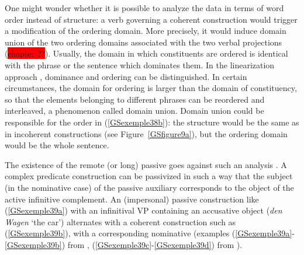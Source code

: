 \documentclass[output=paper
	        ,collection
	        ,collectionchapter
 	        ,biblatex
                ,babelshorthands
                ,newtxmath
                ,draftmode
                ,colorlinks, citecolor=brown
]{langscibook}
\begin{document}
{One might wonder whether it is possible to analyze the data in terms of word order instead of structure: a verb governing a coherent construction would trigger a modification of the ordering domain. More precisely, it would induce domain union of the two ordering domains associated with the two verbal projections (\colorbox{red}{chapter ??}). Usually, the domain in which constituents are ordered is identical with the phrase or the sentence which dominates them. In the linearization approach \citep{Reape94a}, dominance and ordering can be distinguished. In certain circumstances, the domain for ordering is larger than the domain of constituency, so that the elements belonging to different phrases can be reordered and interleaved, a phenomenon called domain union. Domain union could be responsible for the order in (\ref{GSexemple38b}): the structure would be the same as in incoherent constructions (see Figure~\ref{GSfigure9a}), but the ordering domain would be the whole sentence.

The existence of the remote (or long) passive goes against such an analysis \citep{HN94a, Kathol98b, Mueller2002b}. A complex predicate construction can be passivized in such a way that the subject (in the nominative case) of the passive auxiliary corresponds to the object of the active infinitive complement. An (impersonal) passive construction like (\ref{GSexemple39a}) with an infinitival VP containing an accusative object (\emph{den Wagen} `the car') alternates with a coherent construction such as (\ref{GSexemple39b}), with a corresponding nominative (examples (\ref{GSexemple39a}-\ref{GSexemple39b}) from \citealt[137]{Mueller2002b}, (\ref{GSexemple39c}-\ref{GSexemple39d}) from \citealt[40]{Mueller2003a}). 

\eal
	\label{GSexemple39} 
	\label{GSexemple39a}

	\label{GSexemple39b}

	\label{GSexemple39c}	
		
}
\end{document}
